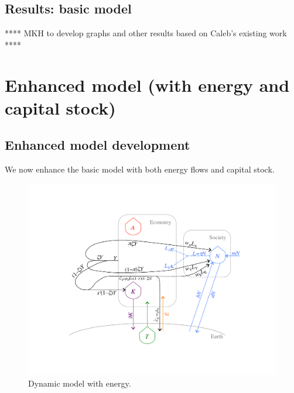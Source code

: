 \documentclass[letterpaper,12pt]{article}
\begin{document}
\subsection{Results: basic model}
\label{sec:Results_basic_model}

**** MKH to develop graphs and other results based on Caleb's existing work ****


\section{Enhanced model (with energy and capital stock)}
\label{sec:Enhanced_model}

\subsection{Enhanced model development}
\label{sec:Enhanced_model_development}

We now enhance the basic model with both energy flows and capital stock.

\begin{figure} \label{fig:ModelWithEnergy}
  \begin{center}
    \includegraphics[width=\textwidth]{figure_other/ModelWithEnergy.pdf}
    \caption{Dynamic model with energy.}
  \end{center}
\end{figure}
\end{document}
